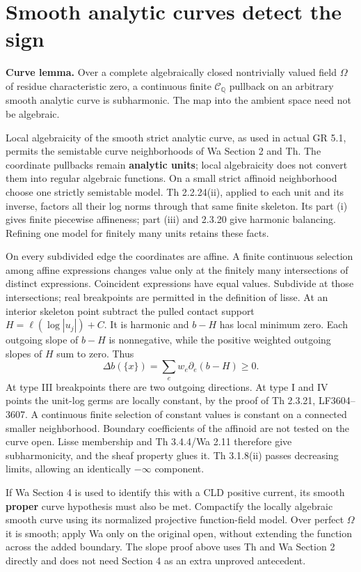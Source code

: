 \documentclass[
  11pt,
]{article}
\begin{document}
\section{Smooth analytic curves detect the
sign}\label{smooth-analytic-curves-detect-the-sign}

\textbf{Curve lemma.} Over a complete algebraically closed nontrivially
valued field \(\Omega\) of residue characteristic zero, a continuous
finite \(\mathcal C_{\mathbb Q}\) pullback on an arbitrary smooth
analytic curve is subharmonic. The map into the ambient space need not
be algebraic.

Local algebraicity of the smooth strict analytic curve, as used in
actual GR 5.1, permits the semistable curve neighborhoods of Wa Section
2 and Th. The coordinate pullbacks remain \textbf{analytic units}; local
algebraicity does not convert them into regular algebraic functions. On
a small strict affinoid neighborhood choose one strictly semistable
model. Th 2.2.24(ii), applied to each unit and its inverse, factors all
their log norms through that same finite skeleton. Its part (i) gives
finite piecewise affineness; part (iii) and 2.3.20 give harmonic
balancing. Refining one model for finitely many units retains these
facts.

On every subdivided edge the coordinates are affine. A finite continuous
selection among affine expressions changes value only at the finitely
many intersections of distinct expressions. Coincident expressions have
equal values. Subdivide at those intersections; real breakpoints are
permitted in the definition of lisse. At an interior skeleton point
subtract the pulled contact support \(H=\ell(\log|u_j|)+C\). It is
harmonic and \(b-H\) has local minimum zero. Each outgoing slope of
\(b-H\) is nonnegative, while the positive weighted outgoing slopes of
\(H\) sum to zero. Thus
\[\Delta b(\{x\})=\sum_e w_e\partial_e(b-H)\ge0. \tag{10}\] At type III
breakpoints there are two outgoing directions. At type I and IV points
the unit-log germs are locally constant, by the proof of Th 2.3.21,
LF3604--3607. A continuous finite selection of constant values is
constant on a connected smaller neighborhood. Boundary coefficients of
the affinoid are not tested on the curve open. Lisse membership and Th
3.4.4/Wa 2.11 therefore give subharmonicity, and the sheaf property
glues it. Th 3.1.8(ii) passes decreasing limits, allowing an identically
\(-\infty\) component.

If Wa Section 4 is used to identify this with a CLD positive current,
its smooth \textbf{proper} curve hypothesis must also be met. Compactify
the locally algebraic smooth curve using its normalized projective
function-field model. Over perfect \(\Omega\) it is smooth; apply Wa
only on the original open, without extending the function across the
added boundary. The slope proof above uses Th and Wa Section 2 directly
and does not need Section 4 as an extra unproved antecedent.
\end{document}
